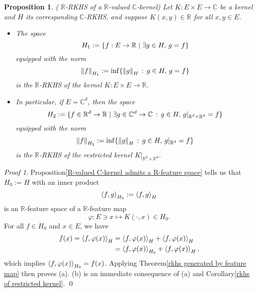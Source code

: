 \documentclass[a4paper,12pt]{article}
\newtheorem{prp}[thm]{Proposition}
\theoremstyle{remark}
\newtheorem*{prf}{Proof}
\theoremstyle{definition}
\theoremstyle{definition}
\theoremstyle{definition}
\newcommand{\ip}[2]{\left<#1, #2 \right>}
\newcommand{\norm}[1]{\left\| #1 \right\|}
\let\Re\relax
\DeclareMathOperator{\Re}{Re}
\let\Im\relax
\DeclareMathOperator{\Im}{Im}
\begin{document}
\begin{prp}( \( \mathbb{R} \)-RKHS of a \( \mathbb{R} \)-valued \( \mathbb{C} \)-kernel)
	Let \( K: E \times E \to \mathbb{C} \) be a kernel and \( H \) its corresponding \( \mathbb{C} \)-RKHS, and suppose \( K(x,y) \in \mathbb{R} \) for all \( x, y \in E \).
	\begin{itemize}
		\item[(a)] The space
		      \begin{equation*}
			      H_1:=\{f:E \to \mathbb{R} \mid \exists g \in H,\,\Re g = f\}
		      \end{equation*}
		      equipped with the norm
		      \begin{equation*}
			      \norm{f}_{H_1} := \inf \{\norm{g}_H\,:\, g \in H,\,\Re g = f\}
		      \end{equation*}
		      is the \( \mathbb{R} \)-RKHS of the kernel \( K:E \times E \to \mathbb{R} \).

		\item[(b)] In particular, if \( E =\mathbb{C}^d \), then the space
		      \begin{equation*}
			      H_2:=\{f \in \mathbb{R}^d \to \mathbb{R} \mid \exists g \in \mathbb{C}^d \to \mathbb{C}\,:\, g \in H,\,\Re g|_{\mathbb{R}^d \times \mathbb{R}^d} =f \}
		      \end{equation*}
		      equipped with the norm
		      \begin{equation*}
			      \norm{f}_{H_2} := \inf \{\norm{g}_H \,:\, g \in H,\,\Re g|_{\mathbb{R}^d}=f\}
		      \end{equation*}
		      is the \( \mathbb{R} \)-RKHS of the restricted kernel \( K|_{\mathbb{R}^d \times \mathbb{R}^d} \).
	\end{itemize}
\end{prp}
\begin{prf}
	Proposition\ref{R-valued C-kernel admits a R-feature space} tells us that \( H_0:=H \) with an inner product
	\begin{equation*}
		\ip{f}{g}_{H_0}:= \Re \ip{f}{g}_H
	\end{equation*}
	is an \( \mathbb{R} \)-feature space of a \( \mathbb{R} \)-feature map
	\begin{equation*}
		\varphi:E \ni x \mapsto K(\cdot ,x) \in H_0.
	\end{equation*}
	For all \( f \in H_0 \) and \( x \in E \), we have
	\begin{equation*}
		\begin{aligned}
			f(x) = \ip{f}{\varphi(x)}_H
			 & = \Re \ip{f}{\varphi(x)}_H + \Im \ip{f}{\varphi(x)}_H  \\
			 & = \ip{f}{\varphi(x)}_{H_0} + \Im \ip{f}{\varphi(x)}_H,
		\end{aligned}
	\end{equation*}
	which implies \( \ip{f}{\varphi(x)}_{H_0}= \Re f(x) \). Applying Theorem\ref{rkhs generated by feature map} then proves (a). (b) is an immediate consequence of (a) and Corollary\ref{rkhs of restricted kernel}.
	\qed\end{prf}
\end{document}
